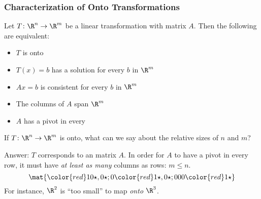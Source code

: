 \begin{frame}
\begin{center}
\end{center}

\end{frame}



\begin{frame}
\frametitle{Characterization of Onto Transformations}

\vskip -3mm
\begin{thm}
  Let $T\colon\R^n\to\R^m$ be a linear transformation with matrix $A$.  Then the
  following are equivalent:
  \begin{itemize}
  \item $T$ is onto
    \pause
  \item $T(x) = b$ has a solution for every $b$ in $\R^m$
    \pause
  \item $Ax = b$ is consistent for every $b$ in $\R^m$
    \pause
  \item The columns of $A$ span $\R^m$
    \pause
  \item $A$ has a pivot in every 
  \end{itemize}
\end{thm}

\pause[7]

\begin{ques}
  If $T\colon\R^n\to\R^m$ is onto, what can we say about the relative sizes of
  $n$ and $m$?
\end{ques}

\pause
\alert{Answer:} $T$ corresponds to an  matrix $A$.
\pause[10]
In order for $A$ to have a pivot in every row, it must have
\emph{at least as many} columns as rows: $m\leq n$.
\pause
\[ \mat{
\color{red}1   0   \star,   0   \star ;
0   \color{red}1   \star , 0   \star ;
0   0   0   \color{red}1   \star 
} \]
\pause
For instance, $\R^2$ is ``too small'' to map \emph{onto\/} $\R^3$.

\end{frame}


